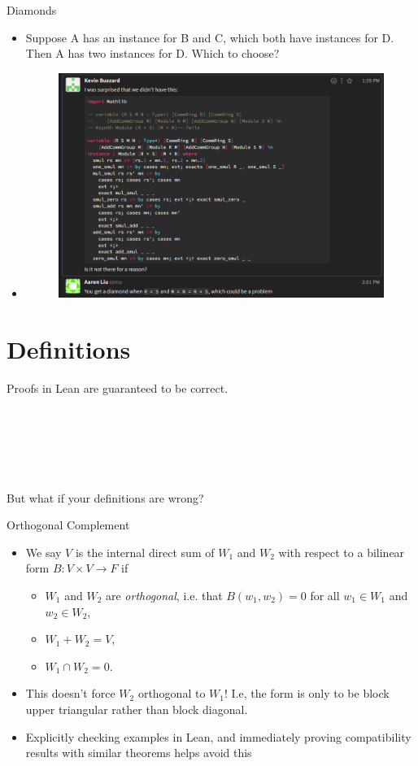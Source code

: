 \documentclass[svgnames]{beamer}
\begin{document}
\begin{frame}{Diamonds}
\begin{itemize}[<+->]
    \item Suppose A has an instance for B and C, which both have instances for D. Then A has two instances for D. Which to choose? 
    \item 
\begin{figure}
    \centering
    \includegraphics[width=0.75\linewidth]{image7.png}
\end{figure}
\end{itemize}
\end{frame}

\section{Definitions}

\begin{frame}
\centering
\Large
Proofs in Lean are guaranteed to be correct. 

$ $

$ $

$ $

\pause But what if your definitions are wrong?
\end{frame}

\begin{frame}{Orthogonal Complement}
\begin{itemize}[<+->]
    \item We say $V$ is the internal direct sum of $W_1$ and $W_2$ with respect to a bilinear form $B: V \times V \to F$ if 
\begin{itemize}[<+->]
    \item $W_1$ and $W_2$ are \textit{orthogonal}, i.e. that $B(w_1,w_2)=0$ for all $w_1 \in W_1$ and $w_2 \in W_2$,
    \item $W_1+W_2=V$,
    \item $W_1 \cap W_2=0$. 
    \end{itemize}
    \item This doesn't force $W_2$ orthogonal to $W_1$! \pause I.e, the form is only to be block upper triangular rather than block diagonal. 
    \pause \item Explicitly checking examples in Lean, and immediately proving compatibility results with similar theorems helps avoid this
\end{itemize}

\end{frame}
\end{document}
